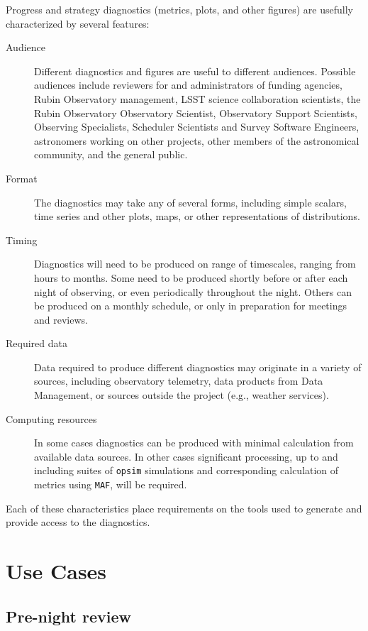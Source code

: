 Progress and strategy diagnostics (metrics, plots, and other figures) are usefully characterized by several features:
\begin{description}
\item[{Audience}] Different diagnostics and figures are useful to different audiences. Possible audiences include reviewers for and administrators of funding agencies, Rubin Observatory management, LSST science collaboration scientists, the Rubin Observatory Observatory Scientist, Observatory Support Scientists, Observing Specialists, Scheduler Scientists and Survey Software Engineers, astronomers working on other projects, other members of the astronomical community, and the general public.
\item[{Format}] The diagnostics may take any of several forms, including simple scalars, time series and other plots, maps, or other representations of distributions.
\item[{Timing}] Diagnostics will need to be produced on range of timescales, ranging from hours to months. Some need to be produced shortly before or after each night of observing, or even periodically throughout the night. Others can be produced on a monthly schedule, or only in preparation for meetings and reviews.
\item[{Required data}] Data required to produce different diagnostics may originate in a variety of sources, including observatory telemetry, data products from Data Management, or sources outside the project (e.g., weather services).
\item[{Computing resources}] In some cases diagnostics can be produced with minimal calculation from available data sources. In other cases significant processing, up to and including suites of \texttt{opsim} simulations and corresponding calculation of metrics using \texttt{MAF}, will be required.
\end{description}

Each of these characteristics place requirements on the tools used to generate and provide access to the diagnostics.

\section{Use Cases}
\label{sec:org4b48ee0}
\subsection{Pre-night review}
\label{sec:org94766f9}

